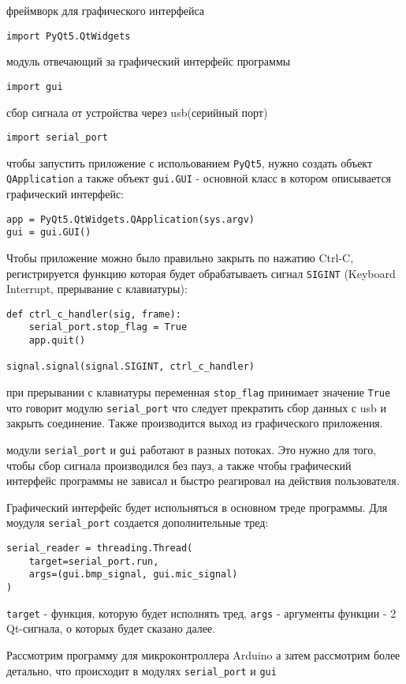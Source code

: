 \documentclass[../main.tex]{subfiles}
\begin{document}
фреймворк для графического интерфейса
\begin{lstlisting}
import PyQt5.QtWidgets
\end{lstlisting}

модуль отвечающий за графический интерфейс программы
\begin{lstlisting}
import gui
\end{lstlisting}

сбор сигнала от устройства через usb(серийный порт)
\begin{lstlisting}
import serial_port
\end{lstlisting}

чтобы запустить приложение с испольованием \verb|PyQt5|, нужно создать объект \verb|QApplication| а также объект \verb|gui.GUI| - основной класс в котором описывается графический интерфейс:

\begin{lstlisting}
app = PyQt5.QtWidgets.QApplication(sys.argv)
gui = gui.GUI()
\end{lstlisting}

Чтобы приложение можно было правильно закрыть по нажатию Ctrl-C, регистрируется функцию которая будет обрабатываеть сигнал \verb|SIGINT| (Keyboard Interrupt, прерывание с клавиатуры):

\begin{lstlisting}
def ctrl_c_handler(sig, frame):
    serial_port.stop_flag = True
    app.quit()

signal.signal(signal.SIGINT, ctrl_c_handler)
\end{lstlisting}

при прерывании с клавиатуры переменная \verb|stop_flag| принимает значение \verb|True| что говорит модулю \verb|serial_port| что следует прекратить сбор данных с usb и закрыть соединение. Также производится выход из графического приложения.

модули \verb|serial_port| и \verb|gui| работают в разных потоках. Это нужно для того, чтобы сбор сигнала производился без пауз, а также чтобы графический интерфейс программы не зависал и быстро реагировал на действия пользователя.

Графический интерфейс будет испольняться в основном треде программы. Для моудуля \verb|serial_port| создается дополнительные тред:


\begin{lstlisting}
serial_reader = threading.Thread(
    target=serial_port.run,
    args=(gui.bmp_signal, gui.mic_signal)
)
\end{lstlisting}

\verb|target| - функция, которую будет исполнять тред, \verb|args| - аргументы функции - 2 Qt-сигнала, о которых будет сказано далее.

Рассмотрим программу для микроконтроллера Arduino а затем рассмотрим более детально, что происходит в модулях \verb|serial_port| и \verb|gui|

\newpage
\end{document}
